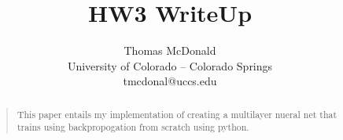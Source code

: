 \documentclass[letterpaper]{article}
\begin{document}
%
\title{HW3 WriteUp}
\author{ Thomas McDonald\\
University of Colorado – Colorado Springs\\
tmcdonal@uccs.edu\\
}
\maketitle
\begin{abstract}
\begin{quote}
This paper entails my implementation of creating a multilayer nueral net that trains using backpropogation from scratch using python.  
\end{quote}
\end{abstract}
\end{document}
